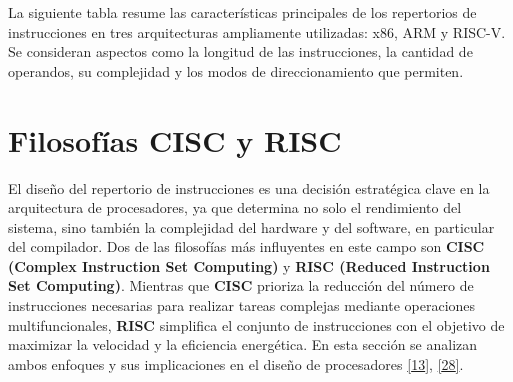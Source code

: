 \documentclass[12pt,oneside]{templates/unerthesis}
\begin{document}
La siguiente tabla resume las características principales de los repertorios de instrucciones en tres arquitecturas ampliamente utilizadas: x86, ARM y RISC-V. Se consideran aspectos como la longitud de las instrucciones, la cantidad de operandos, su complejidad y los modos de direccionamiento que permiten.

\begin{table}[!h]
\centering
\caption{\label{tab:comparativaISA}Comparativa de repertorios de instrucciones reales}
\centering
{}
\end{table}

\hypertarget{filosofuxedas-cisc-y-risc}{%
\section{Filosofías CISC y RISC}\label{filosofuxedas-cisc-y-risc}}

El diseño del repertorio de instrucciones es una decisión estratégica clave en la arquitectura de procesadores, ya que determina no solo el rendimiento del sistema, sino también la complejidad del hardware y del software, en particular del compilador. Dos de las filosofías más influyentes en este campo son \textbf{CISC (Complex Instruction Set Computing)} y \textbf{RISC (Reduced Instruction Set Computing)}. Mientras que \textbf{CISC} prioriza la reducción del número de instrucciones necesarias para realizar tareas complejas mediante operaciones multifuncionales, \textbf{RISC} simplifica el conjunto de instrucciones con el objetivo de maximizar la velocidad y la eficiencia energética. En esta sección se analizan ambos enfoques y sus implicaciones en el diseño de procesadores \protect\hyperlink{ref-hennessy2017computer}{{[}13{]}}, \protect\hyperlink{ref-patterson_computer_2014}{{[}28{]}}.
\end{document}
